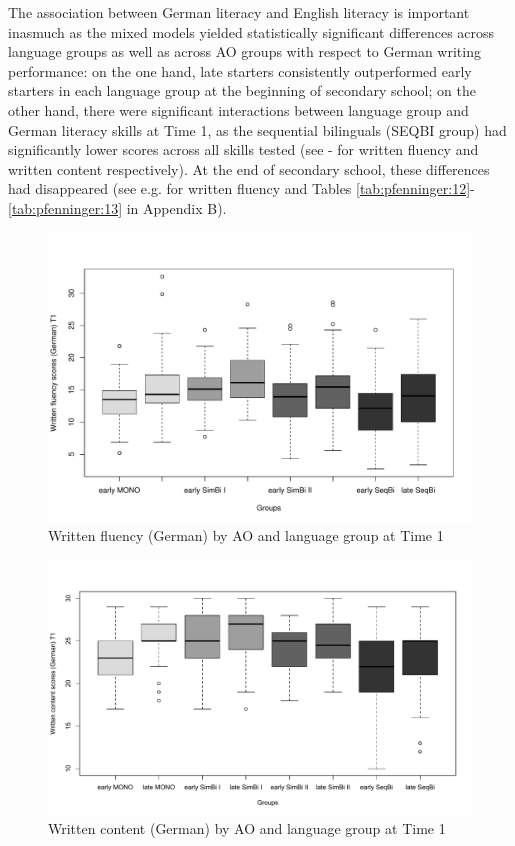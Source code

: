 \documentclass[output=paper,modfonts,nonflat,newtxmath]{langsci/langscibook}
\begin{document}
The association between German literacy and English literacy is important inasmuch as the mixed models yielded statistically significant differences across language groups as well as across AO groups with respect to German writing performance: on the one hand, late starters consistently outperformed early starters in each language group at the beginning of secondary school; on the other hand, there were significant interactions between language group and German literacy skills at Time 1, as the sequential bilinguals (SEQBI group) had significantly lower scores across all skills tested (see - for written fluency and written content respectively). At the end of secondary school, these differences had disappeared (see e.g.  for written fluency and Tables \ref{tab:pfenninger:12}-\ref{tab:pfenninger:13} in Appendix B).


\begin{figure}%
\includegraphics[height=.45\textheight]{figures/PfenningerFigure9.pdf}
 \caption{\label{fig:pfenninger:9}Written fluency (German) by AO and language group at Time 1}
\end{figure}


\begin{figure}%
\includegraphics[width=\textwidth]{figures/PfenningerFigure10.pdf}
\caption{\label{fig:pfenninger:10} Written content (German) by AO and language group at Time 1}
\end{figure}
\end{document}
